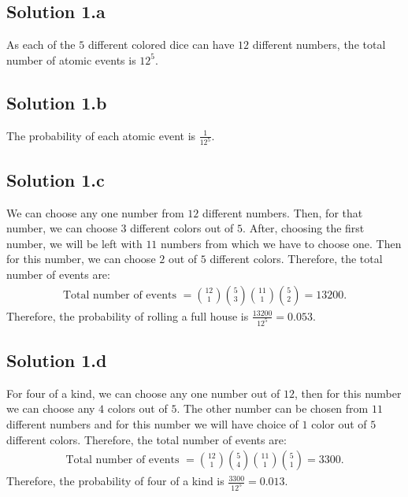 \subsection*{Solution 1.a}
As each of the $5$ different colored dice can have $12$ different numbers, the total number of atomic events is $12^5$.
\subsection*{Solution 1.b}
The probability of each atomic event is $\frac{1}{12^5}$.
\subsection*{Solution 1.c}
We can choose any one number from $12$ different numbers. Then, for that number, we can choose $3$ different colors out of $5$. After, choosing the first number, we will be left with $11$ numbers from which we have to choose one. Then for this number, we can choose $2$ out of $5$ different colors. Therefore, the total number of events are:
\begin{align*}
	\text{Total number of events } = {12 \choose 1} {5 \choose 3} {11 \choose 1} {5 \choose 2} = 13200.
\end{align*}
Therefore, the probability of rolling a full house is $\frac{13200}{12^5} = 0.053$.
\subsection*{Solution 1.d}
For four of a kind, we can choose any one number out of $12$, then for this number we can choose any $4$ colors out of $5$. The other number can be chosen from $11$ different numbers and for this number we will have choice of $1$ color out of $5$ different colors. Therefore, the total number of events are:
\begin{align*}
	\text{Total number of events } = {12 \choose 1}{5 \choose 4}{11 \choose 1}{5 \choose 1} = 3300.
\end{align*}
Therefore, the probability of four of a kind is $\frac{3300}{12^5} = 0.013$.
\parag
